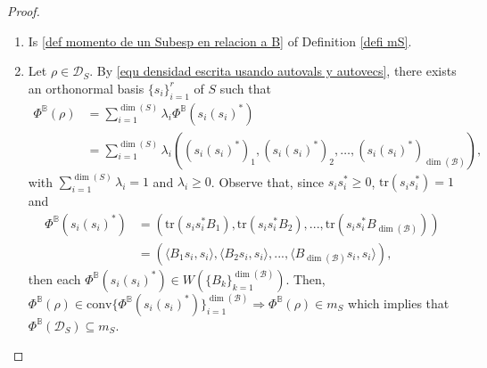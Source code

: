 \documentclass[12pt,a4paper]{article}
\def\calB{\mathcal B}
\def\calD{\mathcal D}
\def\tr{\text{tr}}
\numberwithin{equation}{section}
\begin{document}
\begin{proof}
\begin{enumerate}

	\item[\ref{item3Prop1}.] Is \eqref{def momento de un Subesp en relacion a B} of Definition \ref{defi mS}.
	
	\item[\ref{mS = diag DsubS} $\Leftrightarrow$ \ref{item3Prop1}.] Let $\rho\in\calD_{S}$. By \eqref{equ densidad escrita usando autovals y autovecs}, there exists an orthonormal basis $\{s_i\}_{i=1}^r$ of $S$ such that
	\begin{equation} \label{eq phi de v}
		\begin{split}
		\Phi^{\mathbb{B}}(\rho)&=\sum_{i=1}^{\dim(S)} \lambda_i \Phi^{\mathbb{B}}(s_i (s_i)^*)\\
		&=\sum_{i=1}^{\dim(S)} \lambda_i \left( (s_i (s_i)^*)_1, (s_i (s_i)^*)_2, \dots, (s_{i} (s_{i})^*)_{\dim(\calB)}\right), 
	\end{split}
	\end{equation}
	with $\sum_{i=1}^{\dim(S)}\lambda_i=1$ and $\lambda_i\geq 0$. Observe that, since $s_i s_i^*\geq 0$, $\tr(s_i s_i^*)=1$ and
	\begin{equation*}
		\begin{split}
	\Phi^{\mathbb{B}}(s_i (s_i)^*)&=\left(\tr(s_is_i^*B_1), \tr(s_is_i^*B_2),..., \tr(s_is_i^*B_{\dim(\mathcal{B})}) \right)\\
	&=\left(\langle B_1s_i,s_i\rangle,\langle B_2s_i,s_i\rangle,...,\langle B_{\dim(\mathcal{B})}s_i,s_i\rangle \right),		
		\end{split}
	\end{equation*}
	then each $\Phi^{\mathbb{B}}(s_i (s_i)^*)\in W\left(\{B_k\}_{k=1}^{\dim(\mathcal{B})} \right)$.
	Then, $\Phi^{\mathbb{B}}(\rho)\in\text{conv}\{\Phi^{\mathbb{B}}(s_i (s_i)^*)\}_{i=1}^{\dim(\mathcal{B})}\Rightarrow \Phi^{\mathbb{B}}(\rho)\in m_S$ which implies that $\Phi^{\mathbb{B}}(\calD_{S})\subseteq m_S$.
		

\end{enumerate}
\end{proof}
\end{document}
